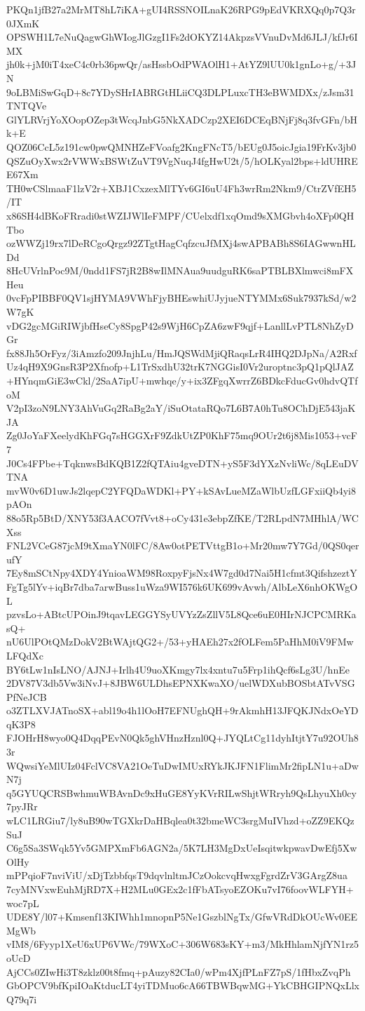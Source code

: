 PKQn1jfB27a2MrMT8hL7iKA+gUI4RSSNOILnaK26RPG9pEdVKRXQq0p7Q3r0JXmK
OPSWH1L7eNuQagwGhWIogJlGzgI1Fs2dOKYZ14AkpzsVVnuDvMd6JLJ/kfJr6IMX
jh0k+jM0iT4xeC4c0rb36pwQr/asHssbOdPWAOlH1+AtYZ9lUU0k1gnLo+g/+3JN
9oLBMiSwGqD+8c7YDySHrIABRGtHLiiCQ3DLPLuxcTH3eBWMDXx/zJsm31TNTQVe
GlYLRVrjYoXOopOZep3tWcqJnbG5NkXADCzp2XEI6DCEqBNjFj8q3fvGFn/bHk+E
QOZ06CcL5z191cw0pwQMNHZeFVoafg2KngFNcT5/bEUg0J5oicJgia19FrKv3jb0
QSZuOyXwx2rVWWxBSWtZuVT9VgNuqJ4fgHwU2t/5/hOLKyal2bps+ldUHREE67Xm
TH0wCSlmaaF1lzV2r+XBJ1CxzexMlTYv6GI6uU4Fh3wrRm2Nkm9/CtrZVfEH5/IT
x86SH4dBKoFRradi0stWZIJWlIeFMPF/CUelxdf1xqOmd9sXMGbvh4oXFp0QHTbo
ozWWZj19rx7lDeRCgoQrgz92ZTgtHagCqfzcuJfMXj4swAPBABh8S6IAGwwnHLDd
8HcUVrlnPoc9M/0ndd1FS7jR2B8wIlMNAua9uudguRK6saPTBLBXlmwci8mFXHeu
0vcFpPIBBF0QV1sjHYMA9VWhFjyBHEswhiUJyjueNTYMMx6Suk7937kSd/w2W7gK
vDG2gcMGiRIWjbfHseCy8SpgP42s9WjH6CpZA6zwF9qjf+LanllLvPTL8NhZyDGr
fx88Jh5OrFyz/3iAmzfo209JnjhLu/HmJQSWdMjiQRaqsLrR4IHQ2DJpNa/A2Rxf
Uz4qH9X9GnsR3P2Xfnofp+L1TrSxdhU32trK7NGGisI0Vr2uroptnc3pQ1pQlJAZ
+HYnqmGiE3wCkl/2SaA7ipU+mwhqe/y+ix3ZFgqXwrrZ6BDkcFducGv0hdvQTfoM
V2pI3zoN9LNY3AhVuGq2RaBg2aY/iSuOtataRQo7L6B7A0hTu8OChDjE543jaKJA
Zg0JoYaFXeelydKhFGq7sHGGXrF9ZdkUtZP0KhF75mq9OUr2t6j8Mis1053+vcF7
J0Cs4FPbe+TqknwsBdKQB1Z2fQTAiu4gveDTN+yS5F3dYXzNvliWc/8qLEuDVTNA
mvW0v6D1uwJs2lqepC2YFQDaWDKl+PY+kSAvLueMZaWlbUzfLGFxiiQb4yi8pAOn
88o5Rp5BtD/XNY53f3AACO7fVvt8+oCy431e3ebpZfKE/T2RLpdN7MHhlA/WCXss
FNL2VCeG87jcM9tXmaYN0lFC/8Aw0otPETVttgB1o+Mr20mw7Y7Gd/0QS0qerufY
7Ey8mSCtNpy4XDY4YnioaWM98RoxpyFjsNx4W7gd0d7Nai5H1cfmt3QifshzeztY
FgTg5lYv+iqBr7dba7arwBuss1uWza9WI576k6UK699vAvwh/AlbLeX6nhOKWgOL
pzvsLo+ABtcUPOinJ9tqavLEGGYSyUVYzZsZllV5L8Qce6uE0HIrNJCPCMRKasQ+
nU6UlPOtQMzDokV2BtWAjtQG2+/53+yHAEh27x2fOLFem5PaHhM0iV9FMwLFQdXc
BY6tLw1nIsLNO/AJNJ+Irlh4U9uoXKmgy7lx4xntu7u5Frp1ihQcf6sLg3U/hnEe
2DV87V3db5Vw3iNvJ+8JBW6ULDhsEPNXKwaXO/uelWDXubBOSbtATvVSGPfNeJCB
o3ZTLXVJATnoSX+abl19o4h1lOoH7EFNUghQH+9rAkmhH13JFQKJNdxOeYDqK3P8
FJOHrH8wyo0Q4DqqPEvN0Qk5ghVHnzHznl0Q+JYQLtCg11dyhItjtY7u92OUh83r
WQwsiYeMlUIz04FclVC8VA21OeTuDwIMUxRYkJKJFN1FlimMr2fipLN1u+aDwN7j
q5GYUQCRSBwhmuWBAvnDc9xHuGE8YyKVrRILwShjtWRryh9QsLhyuXh0cy7pyJRr
wLC1LRGiu7/ly8uB90wTGXkrDaHBqlea0t32bmeWC3srgMuIVhzd+oZZ9EKQzSuJ
C6g5Sa3SWqk5Yv5GMPXmFb6AGN2a/5K7LH3MgDxUeIsqitwkpwavDwEfj5XwOlHy
mPPqioF7nviViU/xDjTzbbfqsT9dqvlnltmJCzOokcvqHwxgFgrdZrV3GArgZ8ua
7cyMNVxwEuhMjRD7X+H2MLu0GEx2c1fFbATsyoEZOKu7vI76foovWLFYH+woc7pL
UDE8Y/l07+Kmsenf13KIWhh1mnopnP5Ne1GszblNgTx/GfwVRdDkOUcWv0EEMgWb
vIM8/6Fyyp1XeU6xUP6VWc/79WXoC+306W683sKY+m3/MkHhlamNjfYN1rz5oUcD
AjCCs0ZIwHi3T8zklz00t8fmq+pAuzy82CIa0/wPm4XjfPLnFZ7pS/1fHbxZvqPh
GbOPCV9bfKpiIOaKtducLT4yiTDMuo6cA66TBWBqwMG+YkCBHGIPNQxLlxQ79q7i
